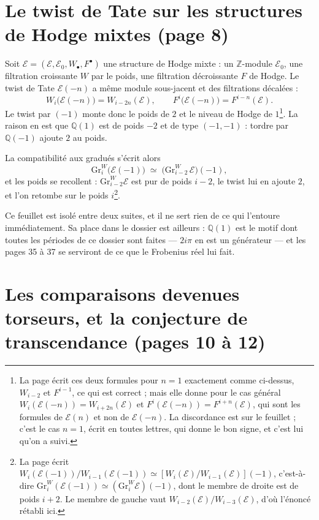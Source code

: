 \documentclass[11pt,a4paper]{article}
\begin{document}
\section*{Le twist de Tate sur les structures de Hodge mixtes (page 8)}

Soit $\mathcal{E} = (\mathcal{E}, \mathcal{E}_{0}, W_{\bullet}, F^{\bullet})$
une structure de Hodge mixte : un $\mathbb{Z}$-module $\mathcal{E}_{0}$, une
filtration croissante $W$ par le poids, une filtration décroissante $F$ de
Hodge. Le twist de Tate $\mathcal{E}(-n)$ a même module sous-jacent et des
filtrations décalées :
\[
  W_{i}\bigl(\mathcal{E}(-n)\bigr) = W_{i-2n}(\mathcal{E}) ,
  \qquad
  F^{i}\bigl(\mathcal{E}(-n)\bigr) = F^{i-n}(\mathcal{E}) .
\]
Le twist par $(-1)$ monte donc le poids de $2$ et le niveau de Hodge de
$1$\footnote{La page écrit ces deux formules pour $n = 1$ exactement comme
ci-dessus, $W_{i-2}$ et $F^{i-1}$, ce qui est correct ; mais elle donne pour le
cas général $W_{i}(\mathcal{E}(-n)) = W_{i+2n}(\mathcal{E})$ et
$F^{i}(\mathcal{E}(-n)) = F^{i+n}(\mathcal{E})$, qui sont les formules de
$\mathcal{E}(n)$ et non de $\mathcal{E}(-n)$. La discordance est sur le
feuillet ; c'est le cas $n = 1$, écrit en toutes lettres, qui donne le bon
signe, et c'est lui qu'on a suivi.}. La raison en est que $\mathbb{Q}(1)$ est
de poids $-2$ et de type $(-1,-1)$ : tordre par $\mathbb{Q}(-1)$ ajoute $2$ au
poids.

La compatibilité aux gradués s'écrit alors
\[
  \mathrm{Gr}^{W}_{i}\bigl(\mathcal{E}(-1)\bigr)
  \;\simeq\; \bigl(\mathrm{Gr}^{W}_{i-2}\,\mathcal{E}\bigr)(-1) ,
\]
et les poids se recollent : $\mathrm{Gr}^{W}_{i-2}\mathcal{E}$ est pur de poids
$i-2$, le twist lui en ajoute $2$, et l'on retombe sur le
poids $i$\footnote{La page écrit
$W_{i}(\mathcal{E}(-1))/W_{i-1}(\mathcal{E}(-1)) \simeq
[W_{i}(\mathcal{E})/W_{i-1}(\mathcal{E})](-1)$, c'est-à-dire
$\mathrm{Gr}^{W}_{i}(\mathcal{E}(-1)) \simeq (\mathrm{Gr}^{W}_{i}\mathcal{E})(-1)$,
dont le membre de droite est de poids $i+2$. Le membre de gauche vaut
$W_{i-2}(\mathcal{E})/W_{i-3}(\mathcal{E})$, d'où l'énoncé rétabli ici.}.

Ce feuillet est isolé entre deux suites, et il ne sert rien de ce qui l'entoure
immédiatement. Sa place dans le dossier est ailleurs : $\mathbb{Q}(1)$ est le
motif dont toutes les périodes de ce dossier sont faites — $2i\pi$ en est un
générateur — et les pages 35 à 37 se serviront de ce que le Frobenius réel lui
fait.

\section*{Les comparaisons devenues torseurs, et la conjecture de transcendance (pages 10 à 12)}
\end{document}

